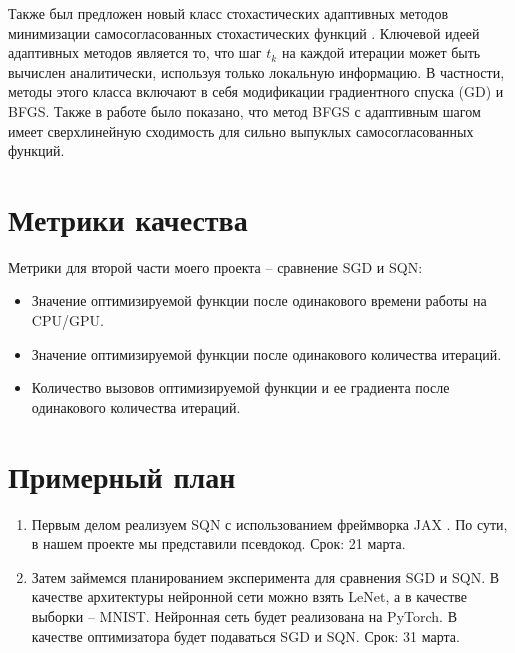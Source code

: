 \documentclass[]{scrartcl}
\begin{document}
Также был предложен новый класс стохастических адаптивных методов минимизации самосогласованных стохастических функций \cite{conf/icml/ZhouGG17}. Ключевой идеей адаптивных методов является то, что шаг $t_k$ на каждой итерации может быть вычислен аналитически, используя только локальную информацию. В частности, методы этого класса включают в себя модификации градиентного спуска (GD) и BFGS. Также в работе \cite{journals/oms/GaoG19} было показано, что метод BFGS с адаптивным шагом имеет сверхлинейную сходимость для сильно выпуклых самосогласованных функций. 


\section{Метрики качества}

Метрики для второй части моего проекта -- сравнение SGD и SQN:

\begin{itemize}
\item Значение оптимизируемой функции после одинакового времени работы на CPU/GPU.
\item Значение оптимизируемой функции после одинакового количества итераций.
\item Количество вызовов оптимизируемой функции и ее градиента после одинакового количества итераций.
\end{itemize}

\section{Примерный план}

\begin{enumerate}
\item Первым делом реализуем SQN с использованием фреймворка JAX \cite{jax2018github}. По сути, в нашем проекте мы представили псевдокод. Срок: 21 марта.
\item Затем займемся планированием эксперимента для сравнения SGD и SQN. В качестве архитектуры нейронной сети можно взять LeNet, а в качестве выборки -- MNIST. Нейронная сеть будет реализована на PyTorch. В качестве оптимизатора будет подаваться SGD и SQN. Срок: 31 марта. 
\end{enumerate}



\end{document}
